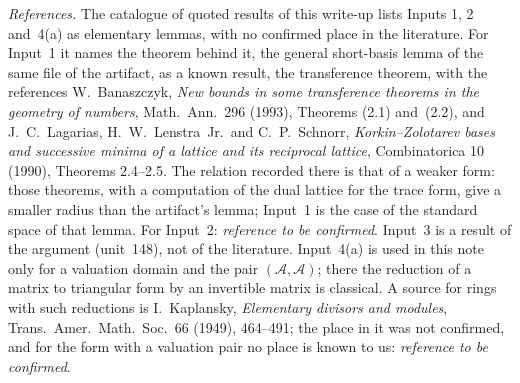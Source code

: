 \documentclass[11pt,a4paper]{article}
\newcommand{\m}[1]{\mbox{$#1$}}        %
\theoremstyle{plainx}
\theoremstyle{uprightx}
\begin{document}
\emph{References.} The catalogue of quoted results of this write-up lists Inputs 1, 2 and~4(a) as elementary
lemmas, with no confirmed place in the literature. For Input~1 it names the theorem behind it, the general
short-basis lemma of the same file of the artifact, as a known result, the transference theorem, with the
references W.~Banaszczyk, \emph{New bounds in some transference theorems in the geometry of numbers}, Math.\ Ann.\
296 (1993), Theorems (2.1) and~(2.2), and J.~C.~Lagarias, H.~W.~Lenstra~Jr.\ and C.~P.~Schnorr,
\emph{Korkin--Zolotarev bases and successive minima of a lattice and its reciprocal lattice}, Combinatorica 10
(1990), Theorems 2.4--2.5. The relation recorded there is that of a weaker form: those theorems, with a
computation of the dual lattice for the trace form, give a smaller radius than the artifact's lemma; Input~1 is
the case of the standard space of that lemma. For Input~2: \emph{reference to be confirmed}. Input~3 is a result of the argument (unit~148),
not of the literature. Input~4(a) is used in this note only for a valuation domain and the pair
\m{(\mathcal{A},\mathcal{A})}; there the reduction of a matrix to triangular form by an invertible matrix is
classical. A source for rings with such reductions is I.~Kaplansky, \emph{Elementary divisors and modules}, Trans.\
Amer.\ Math.\ Soc.\ 66 (1949), 464--491; the place in it was not confirmed, and for the form with a valuation pair
no place is known to us: \emph{reference to be confirmed}.
\end{document}
